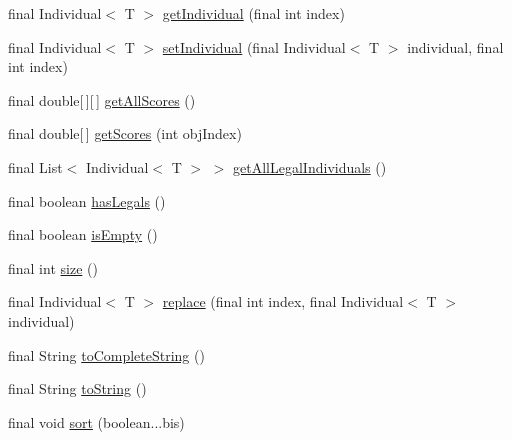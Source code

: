 \begin{DoxyCompactItemize}
final Individual$<$ T $>$ \hyperlink{classjenes_1_1population_1_1_population_3_01_t_01extends_01_chromosome_01_4_a5d2f001f4231421e7f6e496d64624bc5}{get\-Individual} (final int index)
\item 
final Individual$<$ T $>$ \hyperlink{classjenes_1_1population_1_1_population_3_01_t_01extends_01_chromosome_01_4_a5bbd5716ed2a0cac05652795d4bcc84a}{set\-Individual} (final Individual$<$ T $>$ individual, final int index)
\item 
final double\mbox{[}$\,$\mbox{]}\mbox{[}$\,$\mbox{]} \hyperlink{classjenes_1_1population_1_1_population_3_01_t_01extends_01_chromosome_01_4_a248c61464f3f188466989292f4f25811}{get\-All\-Scores} ()
\item 
final double\mbox{[}$\,$\mbox{]} \hyperlink{classjenes_1_1population_1_1_population_3_01_t_01extends_01_chromosome_01_4_a2322c578af3781d89781617203465c2f}{get\-Scores} (int obj\-Index)
\item 
final List$<$ Individual$<$ T $>$ $>$ \hyperlink{classjenes_1_1population_1_1_population_3_01_t_01extends_01_chromosome_01_4_aa357ca41f277c735baf2a0cf3775aedb}{get\-All\-Legal\-Individuals} ()
\item 
final boolean \hyperlink{classjenes_1_1population_1_1_population_3_01_t_01extends_01_chromosome_01_4_a04a6d88ec93e1f09ac1a2a2accd041f3}{has\-Legals} ()
\item 
final boolean \hyperlink{classjenes_1_1population_1_1_population_3_01_t_01extends_01_chromosome_01_4_a6d6d8f4620ce1317c58d97e3537b60a6}{is\-Empty} ()
\item 
final int \hyperlink{classjenes_1_1population_1_1_population_3_01_t_01extends_01_chromosome_01_4_adb9f8282e00932d31fddaa4218c5712e}{size} ()
\item 
final Individual$<$ T $>$ \hyperlink{classjenes_1_1population_1_1_population_3_01_t_01extends_01_chromosome_01_4_ab7f90d1593df2b3166f9489910a133a1}{replace} (final int index, final Individual$<$ T $>$ individual)
\item 
final String \hyperlink{classjenes_1_1population_1_1_population_3_01_t_01extends_01_chromosome_01_4_afd83f18e21084400918c28b9712593eb}{to\-Complete\-String} ()
\item 
final String \hyperlink{classjenes_1_1population_1_1_population_3_01_t_01extends_01_chromosome_01_4_afe4f1ec3a9ebb895c7a6077285cf1868}{to\-String} ()
\item 
final void \hyperlink{classjenes_1_1population_1_1_population_3_01_t_01extends_01_chromosome_01_4_a0996839c203b0edd26445542cb1624d7}{sort} (boolean...\-bis)

\end{DoxyCompactItemize}
